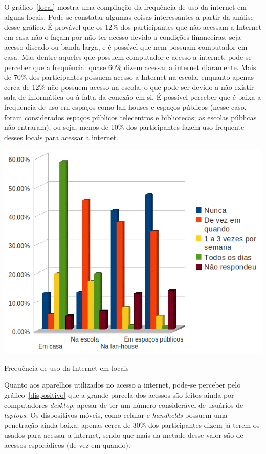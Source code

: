     O gráfico~\ref{local} mostra uma compilação da frequência de uso da internet em alguns locais. Pode-se constatar algumas coisas interessantes a partir da análise desse gráfico. É provável que os 12\% dos participantes que não acessam a Internet em casa não o façam por não ter acesso devido a condições financeiras, seja acesso discado ou banda larga, e é possível que nem possuam computador em casa. Mas dentre aqueles que possuem computador e acesso a internet, pode-se perceber que a frequência: quase 60\% dizem acessar a internet diaramente. Mais de 70\% dos participantes possuem acesso a Internet na escola, enquanto apenas cerca de 12\% não possuem acesso na escola, o que pode ser devido a não existir sala de informática ou à falta da conexão em si. É possível perceber que é baixa a frequencia de uso em espaços como lan houses e espaços públicos (nesse caso, foram considerados espaços públicos telecentros e bibliotecas; as escolas públicas não entraram), ou seja, menos de 10\% dos participantes fazem uso frequente desses locais para acessar a internet.

    \begin{grafico}
        \begin{center}
    \includegraphics[width=0.7\linewidth]{arquivos/local.png}
        \end{center}
        \caption{Frequência de uso da Internet em locais}
        \label{local}
    \end{grafico}

    Quanto aos aparelhos utilizados no acesso a internet, pode-se perceber pelo gráfico~\ref{dispositivo} que a grande parcela dos acessos são feitos ainda por computadores \textit{desktop}, apesar de ter um número considerável de usuários de \textit{laptops}. Os dispositivos móveis, como celular e \textit{handhelds} possuem uma penetração ainda baixa; apenas cerca de 30\% dos participantes dizem já terem os usados para acessar a internet, sendo que mais da metade desse valor são de acessos esporádicos (de vez em quando).

